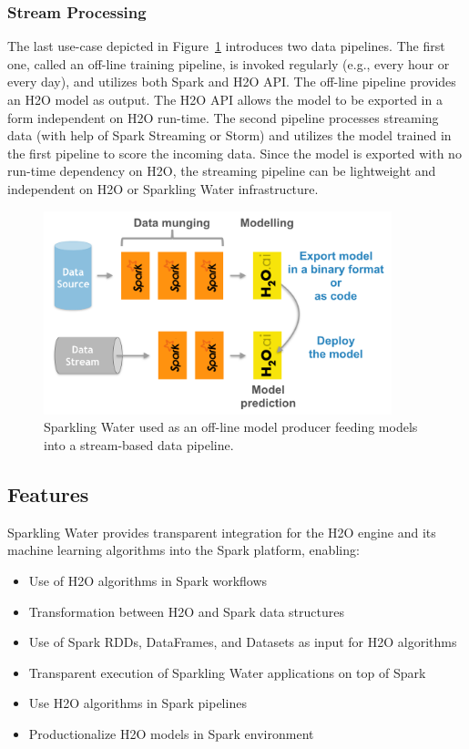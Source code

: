 \documentclass{standalone}
\begin{document}
    \subsubsection{Stream Processing}
    The last use-case depicted in Figure~\ref{fig:uc3} introduces two data pipelines. The first one, called
    an off-line training pipeline, is invoked regularly (e.g., every hour or every day), and utilizes both Spark and H2O API.
    The off-line pipeline provides an H2O model as output. The H2O API allows the model to be exported in a form independent
    on H2O run-time. The second pipeline processes streaming data (with help of Spark Streaming or Storm) and utilizes the
    model trained in the first pipeline to score the incoming data. Since the model is exported with no run-time dependency
    on H2O, the streaming pipeline can be lightweight and independent on H2O or Sparkling Water infrastructure.

    \begin{figure}[h]
        \centering
        \includegraphics[width=0.9\textwidth]{../images/uc3.png}
        \caption{Sparkling Water used as an off-line model producer feeding models into a stream-based data pipeline.}
        \label{fig:uc3}
    \end{figure}

    \subsection{Features}

    Sparkling Water provides transparent integration for the H2O engine and its machine learning algorithms into
    the Spark platform, enabling:

    \begin{itemize}
        \item Use of H2O algorithms in Spark workflows
        \item Transformation between H2O and Spark data structures
        \item Use of Spark RDDs, DataFrames, and Datasets as input for H2O algorithms
        \item Transparent execution of Sparkling Water applications on top of Spark
        \item Use H2O algorithms in Spark pipelines
        \item Productionalize H2O models in Spark environment
    \end{itemize}
\end{document}

